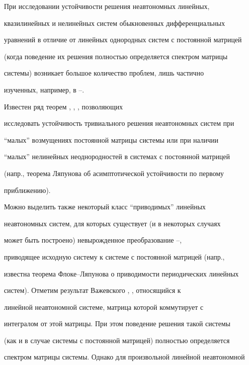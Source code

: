 \label{begin}








При исследовании устойчивости решения неавтономных линейных, 


квазилинейных и нелинейных систем обыкновенных дифференциальных 


уравнений в отличие от линейных однородных систем с постоянной матрицей 


(когда поведение их решения полностью определяется спектром матрицы 


системы) возникает большое количество проблем, лишь частично 


изученных, например, в \cite{1}--\cite{11}.





Известен ряд теорем \cite{2}, \cite{6}, \cite{7}, позволяющих 


исследовать устойчивость тривиального решения неавтономных систем при 


``малых'' возмущениях постоянной матрицы системы или при наличии 


``малых'' нелинейных неоднородностей в системах с постоянной матрицей 


(напр., теорема Ляпунова об асимптотической устойчивости по первому 


приближению).





Можно выделить также некоторый класс ``приводимых'' линейных 


неавтономных систем, для которых существует (и в некоторых случаях 


может быть построено) невырожденное преобразование \cite{1}--\cite{7}, 


приводящее исходную систему к системе с постоянной матрицей (напр., 


известна теорема Флоке--Ляпунова о приводимости периодических линейных 


систем). Отметим результат Важевского \cite{2}, \cite{7}, относящийся к 


линейной неавтономной системе, матрица которой коммутирует с 


интегралом от этой матрицы. При этом поведение решения такой системы 


(как и в случае системы с постоянной матрицей) полностью определяется 


спектром матрицы системы. Однако для произвольной линейной неавтономной


